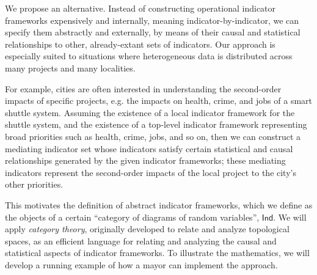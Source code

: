 \documentclass[sigconf]{acmart}
\newcommand{\Cat}[1]{\mathsf{#1}}
\def\Ind{\Cat{Ind}}
\begin{document}
We propose an alternative. Instead of constructing operational indicator frameworks expensively and internally, meaning indicator-by-indicator, we can specify them abstractly and externally, by means of their causal and statistical relationships to other, already-extant sets of indicators. Our approach is especially suited to situations where heterogeneous data is distributed across many projects and many localities.

For example, cities are often interested in understanding the second-order impacts of specific projects, e.g. the impacts on health, crime, and jobs of a smart shuttle system. Assuming the existence of a local indicator framework for the shuttle system, and the existence of a top-level indicator framework representing broad priorities such as health, crime, jobs, and so on, then we can construct a mediating indicator set whose indicators satisfy certain statistical and causal relationships generated by the given indicator frameworks; these mediating indicators represent the second-order impacts of the local project to the city's other priorities. %

This motivates the definition of abstract indicator frameworks, which we define as the objects of a certain ``category of diagrams of random variables'', $\Ind$. We will apply \emph{category theory}, originally developed to relate and analyze topological spaces, as an efficient language for relating and analyzing the causal and statistical aspects of indicator frameworks. To illustrate the mathematics, we will develop a running example of how a mayor can implement the approach.

\end{document}
